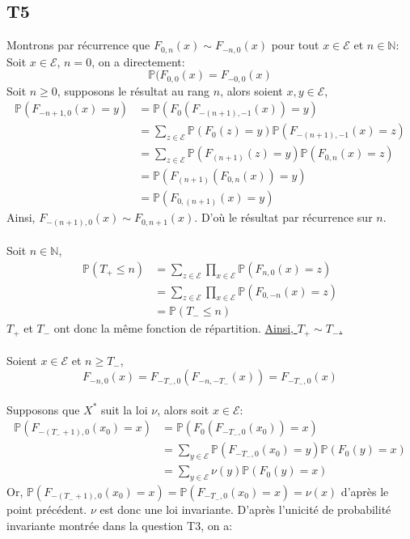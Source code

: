 \documentclass[a4paper,11pt]{article}
\def \P{\mathbb{P}}
\def \E{\mathcal{E}}
\begin{document}
\subsection{T5}
Montrons par récurrence que $F_{0,n}(x) \sim F_{-n,0}(x)$ pour tout $x \in \E$ et $n \in \mathbb{N}$:
Soit $x \in \E$, $n=0$, on a directement:
\[\P(F_{0,0}(x)=F_{-0,0}(x)\]
Soit $n \geq 0$, supposons le résultat au rang $n$, alors soient $x,y \in \E$,
\begin{equation*}
\begin{split}
\P(F_{-n+1,0}(x)=y)&=\P(F_0(F_{-(n+1),-1}(x))=y)\\
&=\sum_{z \in \E} \P(F_0(z)=y)\P(F_{-(n+1),-1}(x)=z)\\
&=\sum_{z \in \E} \P(F_{(n+1)}(z)=y)\P(F_{0,n}(x)=z)\\ %
&=\P(F_{(n+1)}(F_{0,n}(x))=y)\\
&=\P(F_{0,(n+1)}(x)=y)
\end{split}
\end{equation*}
Ainsi, $F_{-(n+1),0}(x) \sim F_{0,n+1}(x)$.
D'où le résultat par récurrence sur $n$.\\
\\
Soit $n \in \mathbb{N}$,
\begin{equation*}
\begin{split}
\P(T_{+}\leq n)&=\sum_{z \in \E} \prod_{x \in \E} \P(F_{n,0}(x)=z)\\
&=\sum_{z \in \E} \prod_{x \in \E} \P(F_{0,-n}(x)=z)\\
&=\P(T_{-}\leq n)
\end{split}
\end{equation*}
$T_+$ et $T_-$ ont donc la même fonction de répartition.
\underline{Ainsi, $T_+ \sim T_-$.}\\
\\
Soient $x \in \E$ et $n \geq T_-$,
\[F_{-n,0}(x)=F_{-T_-,0}(F_{-n,-T_-}(x))=F_{-T_-,0}(x)\]\\
Supposons que $X^*$ suit la loi $\nu$, alors soit $x \in \E$:
\begin{equation*}
\begin{split}
\P(F_{-(T_- +1),0}(x_0)=x)&=\P(F_0(F_{-T_-,0}(x_0))=x)\\
&=\sum_{y \in \E}\P(F_{-T_-,0}(x_0)=y)\P(F_0(y)=x)\\
&=\sum_{y \in \E}\nu(y)\P(F_0(y)=x)
\end{split}
\end{equation*}
Or, $\P(F_{-(T_- +1),0}(x_0)=x)=\P(F_{-T_-,0}(x_0)=x)=\nu(x)$ d'après le point précédent.
$\nu$ est donc une loi invariante. D'après l'unicité de probabilité invariante montrée dans la question T3, on a:

\begin{center}
\end{center}
\end{document}
